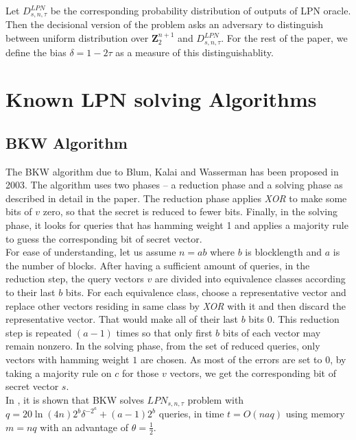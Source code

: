 \documentclass{article}
\begin{document}
  Let $D^{LPN}_{s,n,\tau}$ be the corresponding probability distribution of outputs of LPN oracle. Then the decisional version of the problem asks an adversary to distinguish between uniform distribution over $\mathbf{Z}_2^{n+1}$ and $D^{LPN}_{s,n,\tau}$. For the rest of the paper, we define the bias $\delta=1-2\tau$ as a measure of this distinguishablity.
  
  
  \section{Known LPN solving Algorithms}
  \subsection[2.1]{BKW Algorithm}
      The BKW algorithm due to Blum, Kalai and Wasserman has been proposed in 2003.  The algorithm uses two phases  -- a reduction phase and a solving phase as described in detail in the paper\cite{BKW}. The reduction phase applies \emph{XOR} to make some bits of $v$ zero, so that the secret is reduced to fewer bits. Finally, in the solving phase, it looks for queries that has hamming weight 1 and applies a majority rule to guess the corresponding bit of secret vector.\\
      
      For ease of understanding, let us assume $n=ab$ where $b$ is blocklength and $a$ is the number of blocks. After having a sufficient amount of queries, in the reduction step, the query vectors $v$ are divided into equivalence classes according to their last $b$ bits. For each equivalence class, choose a representative vector and replace other vectors residing in same class by \emph{XOR} with it and then discard the representative vector. That would make all of their last $b$ bits $0$. This reduction step is repeated $(a-1)$ times so that only first $b$ bits of each vector may remain nonzero. In the solving phase, from the set of reduced queries, only vectors with hamming weight $1$ are chosen. As most of the errors are set to $0$, by taking a majority rule on $c$ for those $v$ vectors, we get the corresponding bit of secret vector $s$.\\
      
      In \cite{LF}, it is shown that BKW solves $LPN_{s,n,\tau}$ problem with $q=20 \ln(4n)2^b\delta^{-2^a} + (a-1)2^b$ queries, in time $t=O(naq)$ using memory $m=nq$ with an advantage of $\theta=\frac{1}{2}$.
      
\end{document}
